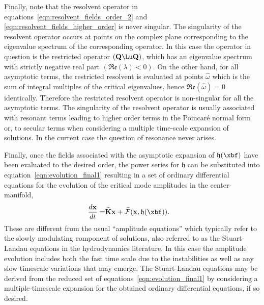 Finally, note that the resolvent operator in equations~\eqref{eqn:resolvent_fields_order_2} and \eqref{eqn:resolvent_fields_higher_order} is never singular. The singularity of the resolvent operator occurs at points on the complex plane corresponding to the eigenvalue spectrum of the corresponding operator. In this case the operator in question is the restricted operator $(\mathbf{Q}\Lu\mathbf{Q})$, which has an eigenvalue spectrum with strictly negative real part $(\mathfrak{Re}(\lambda) < 0)$. On the other hand, for all asymptotic terms, the restricted resolvent is evaluated at points $\widehat{\omega}$ which is the sum of integral multiples of the critical eigenvalues, hence $\mathfrak{Re}(\widehat{\omega}) = 0$ identically. Therefore the restricted resolvent operator is non-singular for all the asymptotic terms. The singularity of the resolvent operator is usually associated with resonant terms leading to higher order terms in the Poincar\'{e} normal form or, to secular terms when considering a multiple time-scale expansion of solutions. In the current case the question of resonance never arises. 

Finally, once the fields associated with the asymptotic expansion of $\mathfrak{h}(\xbf)$ have been evaluated to the desired order, the power series for $\mathfrak{h}$ can be substituted into equation~\eqref{eqn:evolution_final1} resulting in a set of ordinary differential equations for the evolution of the critical mode amplitudes in the center-manifold,
\begin{align}
	\dfrac{d\mathbf{x}}{d t} =& \mathbf{\widehat{K}}\mathbf{x} + \mathcal{\widehat{F}}(\mathbf{x},\mathfrak{h}(\xbf)) \label{eqn:amplitude}.
\end{align}
These are different from the usual ``amplitude equations'' \cite{newell69,cross80,cross09} which typically refer to the slowly modulating component of solutions, also referred to as the Stuart-Landau equations \citep{stuart58,stuart60,sipp07} in the hydrodynamics literature. In this case the amplitude evolution includes both the fast time scale due to the instabilities as well as any slow timescale variations that may emerge. The Stuart-Landau equations may be derived from the reduced set of equations~\eqref{eqn:evolution_final1} by considering a multiple-timescale expansion for the obtained ordinary differential equations, if so desired. 


















